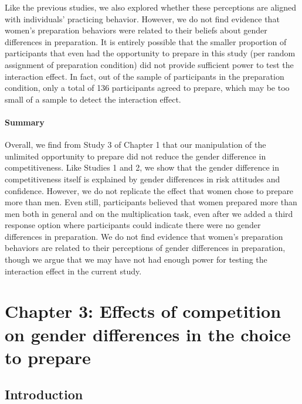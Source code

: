 \documentclass[letterpaper, nobind]{templates/ociamthesis}
\begin{document}
Like the previous studies, we also explored whether these perceptions are aligned with individuals' practicing behavior. However, we do not find evidence that women's preparation behaviors were related to their beliefs about gender differences in preparation. It is entirely possible that the smaller proportion of participants that even had the opportunity to prepare in this study (per random assignment of preparation condition) did not provide sufficient power to test the interaction effect. In fact, out of the sample of participants in the preparation condition, only a total of 136 participants agreed to prepare, which may be too small of a sample to detect the interaction effect.

\hypertarget{summary-2}{%
\subsubsection{Summary}\label{summary-2}}

Overall, we find from Study 3 of Chapter 1 that our manipulation of the unlimited opportunity to prepare did not reduce the gender difference in competitiveness. Like Studies 1 and 2, we show that the gender difference in competitiveness itself is explained by gender differences in risk attitudes and confidence. However, we do not replicate the effect that women chose to prepare more than men. Even still, participants believed that women prepared more than men both in general and on the multiplication task, even after we added a third response option where participants could indicate there were no gender differences in preparation. We do not find evidence that women's preparation behaviors are related to their perceptions of gender differences in preparation, though we argue that we may have not had enough power for testing the interaction effect in the current study.

\hypertarget{chapter-3-effects-of-competition-on-gender-differences-in-the-choice-to-prepare}{%
\chapter{Chapter 3: Effects of competition on gender differences in the choice to prepare}\label{chapter-3-effects-of-competition-on-gender-differences-in-the-choice-to-prepare}}

\hypertarget{introduction-1}{%
\section{Introduction}\label{introduction-1}}
\end{document}
